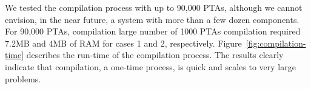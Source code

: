 \documentclass[letterpaper]{article}
\newcommand{\frameImage}[4]{
\begin{figure}[H] 
  \centerline{
    \fcolorbox{frameColor}{white}{
        \texttt{[image: \#1]} } }
    \caption{#4}
    \label{fig:#1}
\end{figure}
}
\begin{document}





We tested the compilation process with up to 90,000 PTAs, although  we cannot envision, in the near future, a system with more than a few dozen components. For 90,000 PTAs, compilation %
large number of 1000 PTAs
compilation 
required  7.2MB and 4MB of RAM for cases 1 and 2, respectively. 
Figure~\ref{fig:compilation-time} 
describes the run-time %
of the compilation process.
%
The results clearly indicate that compilation, a one-time process, is quick and scales to very large problems. 

\end{document}
